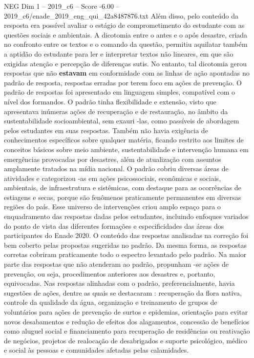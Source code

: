 \begin{textsample}{NEG Dim 1 – 2019\_c6 – Score -6.00 – 2019\_c6/enade\_2019\_eng\_qui\_42a8487876.txt}
Além disso, pelo conteúdo da resposta era possível avaliar o estágio de comprometimento do estudante com as questões sociais e ambientais.
A dicotomia entre o antes e o após desastre, criada no confronto entre os textos e o comando da questão, permitiu aquilatar também a aptidão do estudante para ler e interpretar textos não lineares, em que são exigidas atenção e percepção de diferenças sutis.
No entanto, tal dicotomia gerou respostas que não \textbf{estavam} em conformidade com as linhas de ação apontadas no padrão de resposta, respostas erradas por terem foco em ações de prevenção.
O padrão de respostas foi apresentado em linguagem simples, compatível com o nível dos formandos.
O padrão tinha flexibilidade e extensão, visto que apresentava inúmeras ações de recuperação e de restauração, no âmbito da sustentabilidade socioambiental, sem exauri -las, como passíveis de abordagem pelos estudantes em suas respostas.
Também não havia exigência de conhecimentos específicos sobre qualquer matéria, ficando restrito aos limites de conceitos básicos sobre meio ambiente, sustentabilidade e intervenção humana em emergências provocadas por desastres, além de atualização com assuntos amplamente tratados na mídia nacional.
O padrão cobriu diversas áreas de atividades e categorizou -as em ações psicossociais, econômicas e sociais, ambientais, de infraestrutura e sistêmicas, com destaque para as ocorrências de estiagens e secas, porque são fenômenos praticamente permanentes em diversas regiões do país.
Esse universo de intervenções criou amplo espaço para o enquadramento das respostas dadas pelos estudantes, incluindo enfoques variados do ponto de vista das diferentes formações e especificidades das áreas dos participantes do Enade 2020.
O conteúdo das respostas analisadas na correção foi bem coberto pelas propostas sugeridas no padrão.
Da mesma forma, as respostas corretas cobriram praticamente todo o espectro levantado pelo padrão.
Na maior parte das respostas que não atenderam ao padrão, propunham -se ações de prevenção, ou seja, procedimentos anteriores aos desastres e, portanto, equivocadas.
Nas respostas alinhadas com o padrão, preferencialmente, havia sugestões de ações, dentre as quais se destacaram : recuperação da flora nativa, controle da qualidade da água, organização e treinamento de grupos de voluntários para ações de prevenção de surtos e epidemias, orientação para evitar novos desabamentos e redução de efeitos dos alagamentos, concessão de benefícios como aluguel social e financiamento para recuperação de residências ou reativação de negócios, projetos de realocação de desabrigados e suporte psicológico, médico e social às pessoas e comunidades afetadas pelas calamidades.

\end{textsample}
